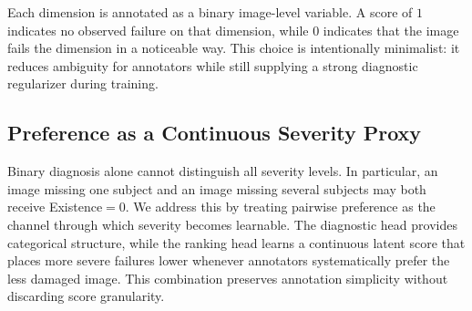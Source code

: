 Each dimension is annotated as a binary image-level variable. A score of $1$ indicates no observed failure on that dimension, while $0$ indicates that the image fails the dimension in a noticeable way. This choice is intentionally minimalist: it reduces ambiguity for annotators while still supplying a strong diagnostic regularizer during training.

\subsection{Preference as a Continuous Severity Proxy}
Binary diagnosis alone cannot distinguish all severity levels. In particular, an image missing one subject and an image missing several subjects may both receive Existence$=0$. We address this by treating pairwise preference as the channel through which severity becomes learnable. The diagnostic head provides categorical structure, while the ranking head learns a continuous latent score that places more severe failures lower whenever annotators systematically prefer the less damaged image. This combination preserves annotation simplicity without discarding score granularity.
